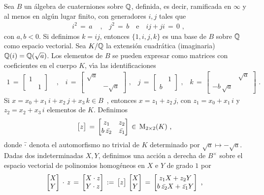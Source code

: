 Sea $B$ un \'{a}lgebra de cuaterniones sobre $\mathbb{Q}$, definida, es decir,
ramificada en $\infty$ y al menos en alg\'{u}n lugar finito, con generadores
$i,j$ tales que
\begin{align*}
	i^{2}\,=\, a & \text{ ,} \quad j^{2}\,=\, b\quad\text{e}\quad
		ij+ji\,=\,0
	\text{ ,}
\end{align*}
%
con $a,b<0$. Si definimos $k=ij$, entonces $\{1,i,j,k\}$ es una base de $B$
sobre $\mathbb{Q}$ como espacio vectorial. Sea $K/\mathbb{Q}$ la extensi\'{o}n
cuadr\'{a}tica (imaginaria) $\mathbb{Q}(i)=\mathbb{Q}(\sqrt{a})$. Los elementos de $B$
se pueden expresar como matrices con coeficientes en el cuerpo $K$, v\'{\i}a
las identificaciones
\begin{align*}
	1 \,=\, \begin{bmatrix} 1 & \\ & 1 \end{bmatrix}
		& \text{ ,}\quad
	i \,=\, \begin{bmatrix} \sqrt{a} & \\ & -\sqrt{a} \end{bmatrix}
			\text{ ,}\quad
	j \,=\, \begin{bmatrix} & 1 \\ b & \end{bmatrix} \text{ ,}\quad
	k \,=\,	\begin{bmatrix} & \sqrt{a} \\ -b\,\sqrt{a} & \end{bmatrix}
	\text{ .}
\end{align*}
%
Si
\begin{math}
	x=x_{0}+x_{1}\,i+x_{2}\,j+x_{3}\,k\in B
\end{math}~, entonces $x=z_1+z_2\,j$, con $z_{1}=x_{0}+x_{1}\,i$ y
$z_{2}=x_{2}+x_{3}\,i$ elementos de $K$. Definimos
\begin{align*}
	\big[z\big] & \,=\, \begin{bmatrix} z_{1} & z_{2} \\
				b\,\bar{z_{2}} & \bar{z_{1}} \end{bmatrix}
				\,\in\,\mathrm{M}_{2\times 2}(K)
	\text{ ,}
\end{align*}
%
donde $\bar{\cdot}$ denota el automorfismo no trivial de $K$ determinado por
$\sqrt{a}\mapsto -\sqrt{a}$. Dadas dos indeterminadas
$X,Y$, definimos una acci\'{o}n a derecha de $B^{\times}$ sobre el espacio
vectorial de polinomios homog\'{e}neos en $X$ e $Y$ de grado $1$ por
\begin{align*}
	\begin{bmatrix} X \\ Y \end{bmatrix}\,\cdot\,z \,=\,
		\begin{bmatrix} X\cdot z \\ Y\cdot z \end{bmatrix}
		& \,:=\,\big[z\big]\,\begin{bmatrix} X \\ Y \end{bmatrix}
			\,=\,\begin{bmatrix} z_{1}X+z_{2}Y \\
				b\,\bar{z_{2}}X+\bar{z_{1}}Y \end{bmatrix}
	\text{ ,}
\end{align*}
